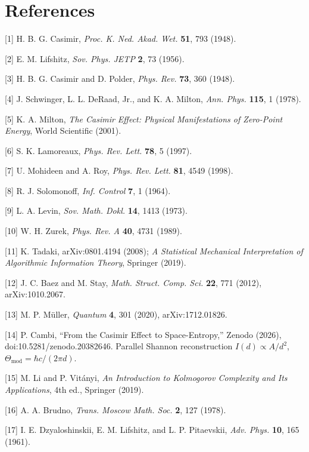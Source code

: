 \documentclass[11pt,letterpaper]{article}
\begin{document}
\begin{sloppypar}
\section*{References}


[1] H. B. G. Casimir, \emph{Proc. K. Ned. Akad. Wet.} \textbf{51}, 793 (1948).


[2] E. M. Lifshitz, \emph{Sov. Phys. JETP} \textbf{2}, 73 (1956).


[3] H. B. G. Casimir and D. Polder, \emph{Phys. Rev.} \textbf{73}, 360 (1948).


[4] J. Schwinger, L. L. DeRaad, Jr., and K. A. Milton, \emph{Ann. Phys.} \textbf{115}, 1 (1978).


[5] K. A. Milton, \emph{The Casimir Effect: Physical Manifestations of Zero-Point Energy}, World Scientific (2001).


[6] S. K. Lamoreaux, \emph{Phys. Rev. Lett.} \textbf{78}, 5 (1997).


[7] U. Mohideen and A. Roy, \emph{Phys. Rev. Lett.} \textbf{81}, 4549 (1998).


[8] R. J. Solomonoff, \emph{Inf. Control} \textbf{7}, 1 (1964).


[9] L. A. Levin, \emph{Sov. Math. Dokl.} \textbf{14}, 1413 (1973).


[10] W. H. Zurek, \emph{Phys. Rev. A} \textbf{40}, 4731 (1989).


[11] K. Tadaki, arXiv:0801.4194 (2008); \emph{A Statistical Mechanical Interpretation of Algorithmic Information Theory}, Springer (2019).


[12] J. C. Baez and M. Stay, \emph{Math. Struct. Comp. Sci.} \textbf{22}, 771 (2012), arXiv:1010.2067.


[13] M. P. Müller, \emph{Quantum} \textbf{4}, 301 (2020), arXiv:1712.01826.


[14] P. Cambi, “From the Casimir Effect to Space-Entropy,” Zenodo (2026), doi:10.5281/zenodo.20382646. Parallel Shannon reconstruction \(I(d)\propto A/d^{2}\), \(\Theta_{\mathrm{mod}}=\hbar c/(2\pi d)\).


[15] M. Li and P. Vitányi, \emph{An Introduction to Kolmogorov Complexity and Its Applications}, 4th ed., Springer (2019).


[16] A. A. Brudno, \emph{Trans. Moscow Math. Soc.} \textbf{2}, 127 (1978).


[17] I. E. Dzyaloshinskii, E. M. Lifshitz, and L. P. Pitaevskii, \emph{Adv. Phys.} \textbf{10}, 165 (1961).



\end{sloppypar}
\end{document}
